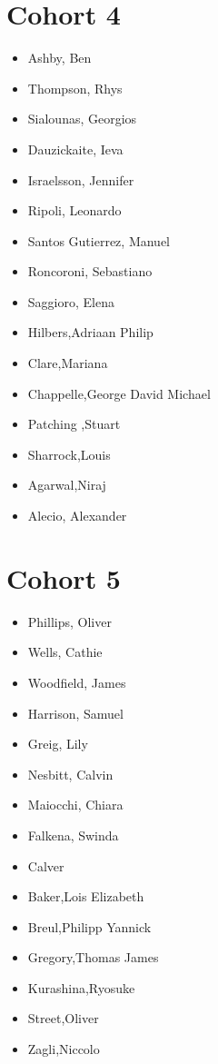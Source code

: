 \documentclass{article}
\begin{document}
\section*{Cohort 4}
\begin{itemize}
    \item Ashby, Ben 
    \item Thompson, Rhys \cite{thompson2020accounting, thompsonpro, bloch2021constraining}
    \item Sialounas, Georgios
    \item Dauzickaite, Ieva \cite{dauvzickaite2020spectral}
    \item Israelsson, Jennifer \cite{israelsson2020spatial}
    \item Ripoli, Leonardo
    \item Santos Gutierrez, Manuel \cite{gutierrez2020response}
    \item Roncoroni, Sebastiano
    \item Saggioro, Elena \cite{saggioro2019quantifying, saggioro2020reconstructing}
    \item Hilbers,Adriaan Philip \cite{hilbers2019importance, bloomfield2021importance, hilbers2020efficient}
    \item Clare,Mariana \cite{clare2021hydro, clare2021assessing}
    \item Chappelle,George David Michael
    \item Patching ,Stuart
    \item Sharrock,Louis
    \item Agarwal,Niraj \cite{ryzhov2020data, ryzhov2019data}
    \item Alecio, Alexander 
\end{itemize}

\section*{Cohort 5}
\begin{itemize}
    \item Phillips, Oliver 
    \item Wells, Cathie \cite{wells2021reducing}
    \item Woodfield, James 
    \item Harrison, Samuel
    \item Greig, Lily
    \item Nesbitt, Calvin
    \item Maiocchi, Chiara
    \item Falkena, Swinda \cite{falkena2021delay, falkena2020revisiting, falkena2019derivation}
    \item Calver
    \item Baker,Lois Elizabeth \cite{baker2020evolution}
    \item Breul,Philipp Yannick
    \item Gregory,Thomas James
    \item Kurashina,Ryosuke
    \item Street,Oliver
    \item Zagli,Niccolo \cite{lucarini2020response}
\end{itemize}

\end{document}
